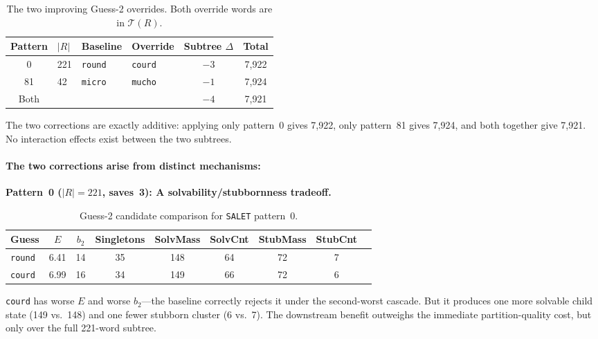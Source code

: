 \documentclass[11pt]{article}
\begin{document}
	\begin{table}[h]
		\centering
		\caption{The two improving Guess-2 overrides.  Both override words are in $\mathcal{T}(R)$.}
		\label{tab:overrides}
		\begin{tabular}{@{}clllcc@{}}
			\toprule
			Pattern & $|R|$ & Baseline & Override & Subtree $\Delta$ & Total \\
			\midrule
			0 & 221 & \texttt{round} & \texttt{courd} & $-3$ & 7,922 \\
			81 & 42 & \texttt{micro} & \texttt{mucho} & $-1$ & 7,924 \\
			\midrule
			Both & & & & $-4$ & 7,921 \\
			\bottomrule
		\end{tabular}
	\end{table}
	
	The two corrections are exactly additive: applying only pattern~0 gives 7,922, only pattern~81 gives 7,924, and both together give 7,921.  No interaction effects exist between the two subtrees.
	
	\paragraph{The two corrections arise from distinct mechanisms:}
	
	\textbf{Pattern~0 ($|R| = 221$, saves~3): A solvability/stubbornness tradeoff.}
	
	\begin{table}[h]
		\centering
		\caption{Guess-2 candidate comparison for \texttt{SALET} pattern~0.}
		\label{tab:pattern0}
		\begin{tabular}{@{}lcccccccc@{}}
			\toprule
			Guess & $E$ & $b_2$ & Singletons & SolvMass & SolvCnt & StubMass & StubCnt \\
			\midrule
			\texttt{round} & 6.41 & 14 & 35 & 148 & 64 & 72 & 7 \\
			\texttt{courd} & 6.99 & 16 & 34 & 149 & 66 & 72 & 6 \\
			\bottomrule
		\end{tabular}
	\end{table}
	
	\texttt{courd} has worse $E$ and worse $b_2$---the baseline correctly rejects it under the second-worst cascade.  But it produces one more solvable child state (149 vs.\ 148) and one fewer stubborn cluster (6 vs.\ 7).  The downstream benefit outweighs the immediate partition-quality cost, but only over the full 221-word subtree.
	
\end{document}
